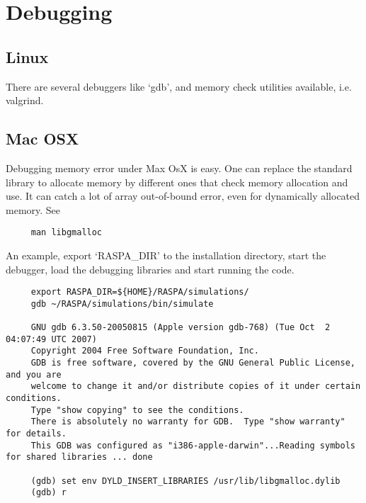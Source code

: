 \section{Debugging}

\subsection{Linux}

There are several debuggers like `gdb', and memory check utilities available, i.e. valgrind.

\subsection{Mac OSX}

Debugging memory error under Max OsX is easy. One can replace the standard library to allocate memory by different ones that check memory allocation and use.
It can catch a lot of array out-of-bound error, even for dynamically allocated memory. See

\begin{verbatim}
     man libgmalloc
\end{verbatim}

An example, export `RASPA\_DIR' to the installation directory, start the debugger, load the debugging libraries and start running the code.
\begin{verbatim}
     export RASPA_DIR=${HOME}/RASPA/simulations/
     gdb ~/RASPA/simulations/bin/simulate

     GNU gdb 6.3.50-20050815 (Apple version gdb-768) (Tue Oct  2 04:07:49 UTC 2007)
     Copyright 2004 Free Software Foundation, Inc.
     GDB is free software, covered by the GNU General Public License, and you are
     welcome to change it and/or distribute copies of it under certain conditions.
     Type "show copying" to see the conditions.
     There is absolutely no warranty for GDB.  Type "show warranty" for details.
     This GDB was configured as "i386-apple-darwin"...Reading symbols for shared libraries ... done

     (gdb) set env DYLD_INSERT_LIBRARIES /usr/lib/libgmalloc.dylib
     (gdb) r
\end{verbatim}


